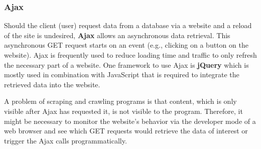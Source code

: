 \subsubsection{Ajax}
  Should the client (user) request data from a database via a website and a reload of the site is undesired, \textbf{Ajax} allows an asynchronous data retrieval.
  This asynchronous GET request starts on an event (e.g., clicking on a button on the website).
  Ajax is frequently used to reduce loading time and traffic to only refresh the necessary part of a website.
  One framework to use Ajax is \textbf{jQuery} which is mostly used in combination with JavaScript that is required to integrate the retrieved data into the website.

  A problem of scraping and crawling programs is that content, which is only visible after Ajax has requested it, is not visible to the program.
  Therefore, it might be necessary to monitor the website's behavior via the developer mode of a web browser and see which GET requests would retrieve the data of interest or trigger the Ajax calls programmatically.
